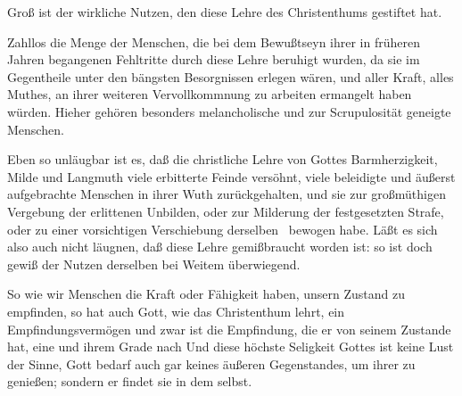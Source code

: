 Groß ist der wirkliche Nutzen, den diese Lehre des Christenthums gestiftet hat.
\begin{aufza}
\item Zahllos die Menge der Menschen, die bei dem Bewußtseyn ihrer in früheren Jahren begangenen Fehltritte durch diese Lehre beruhigt wurden, da sie im Gegentheile unter den bängsten Besorgnissen erlegen wären, und aller Kraft, alles Muthes, an ihrer weiteren Vervollkommnung zu arbeiten ermangelt haben würden. Hieher gehören besonders melancholische und zur Scrupulosität geneigte Menschen.
\item Eben so unläugbar ist es, daß die christliche Lehre von Gottes Barmherzigkeit, Milde und Langmuth viele erbitterte Feinde versöhnt, viele beleidigte und äußerst aufgebrachte Menschen in ihrer Wuth zurückgehalten, und sie zur großmüthigen Vergebung der erlittenen Unbilden, oder zur Milderung der festgesetzten Strafe, oder zu einer vorsichtigen Verschiebung derselben \udgl\  bewogen habe. Läßt es sich also auch nicht läugnen, daß diese Lehre gemißbraucht worden ist: so ist doch gewiß der Nutzen derselben bei Weitem überwiegend.
\end{aufza}

So wie wir Menschen die Kraft oder Fähigkeit haben, unsern Zustand zu empfinden, so hat auch Gott, wie das Christenthum lehrt, ein Empfindungsvermögen und zwar ist die Empfindung, die er von seinem Zustande hat, eine  und ihrem Grade nach  Und diese höchste Seligkeit Gottes ist keine Lust der Sinne, Gott bedarf auch gar keines äußeren Gegenstandes, um ihrer zu genießen; sondern er findet sie in dem  selbst.

